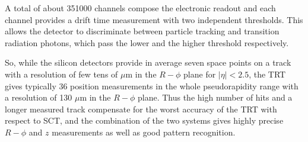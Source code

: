 A total of about 351000 channels compose the electronic readout and each channel provides a drift time measurement with two independent thresholds. This allows the detector to discriminate between particle tracking and transition radiation photons, which pass the lower and the higher threshold respectively. 

So, while the silicon detectors provide in average seven space points on a track with a resolution of few tens of $\mu$m in the $R-\phi$ plane for $|\eta|<2.5$, the TRT gives typically 36 position measurements in the whole pseudorapidity range with a resolution of 130 $\mu$m in the $R-\phi$ plane. Thus the high number of hits and a longer measured track compensate for the worst accuracy of the TRT with respect to SCT, and the combination of the two systems gives highly precise $R-\phi$ and $z$ measurements as well as good pattern recognition.


